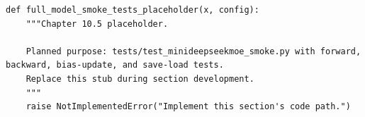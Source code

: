 \begin{lstlisting}[style=bookpython,caption={Planned code placeholder for full model smoke tests.},label={lst:ch10-full-model-smoke-tests}]
def full_model_smoke_tests_placeholder(x, config):
    """Chapter 10.5 placeholder.

    Planned purpose: tests/test_minideepseekmoe_smoke.py with forward, backward, bias-update, and save-load tests.
    Replace this stub during section development.
    """
    raise NotImplementedError("Implement this section's code path.")
\end{lstlisting}
